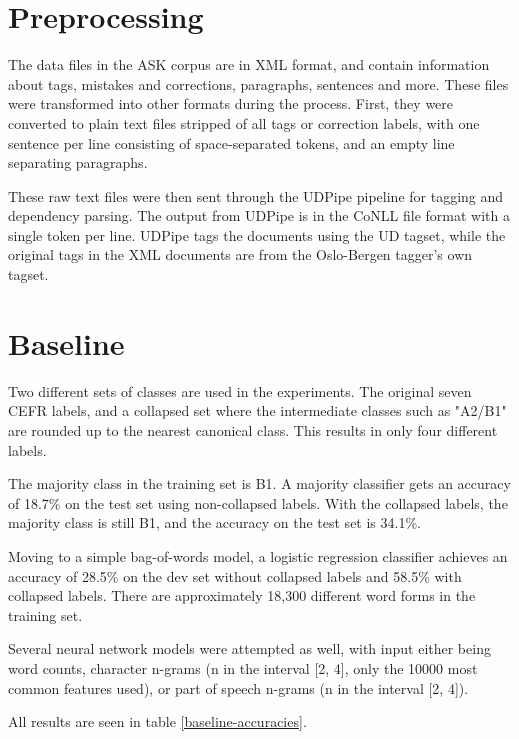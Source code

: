 
\section{Preprocessing}

The data files in the ASK corpus are in XML format, and contain information
about tags, mistakes and corrections, paragraphs, sentences and more. These
files were transformed into other formats during the process. First, they
were converted to plain text files stripped of all tags or correction labels,
with one sentence per line consisting of space-separated tokens, and an empty
line separating paragraphs.

These raw text files were then sent through the UDPipe pipeline for tagging
and dependency parsing. The output from UDPipe is in the CoNLL file format
with a single token per line. UDPipe tags the documents using the UD tagset,
while the original tags in the XML documents are from the Oslo-Bergen
tagger's own tagset.

\section{Baseline}

Two different sets of classes are used in the experiments. The original seven
CEFR labels, and a collapsed set where the intermediate classes such as
"A2/B1" are rounded up to the nearest canonical class. This results in only
four different labels.

The majority class in the training set is B1. A majority classifier gets an
accuracy of 18.7\% on the test set using non-collapsed labels. With the
collapsed labels, the majority class is still B1, and the accuracy on the
test set is 34.1\%.

Moving to a simple bag-of-words model, a logistic regression classifier
achieves an accuracy of 28.5\% on the dev set without collapsed labels and
58.5\% with collapsed labels. There are approximately 18,300 different word
forms in the training set.

Several neural network models were attempted as well, with input either being
word counts, character n-grams (n in the interval [2, 4], only the 10000 most
common features used), or part of speech n-grams (n in the interval [2, 4]).

All results are seen in table \ref{baseline-accuracies}.

